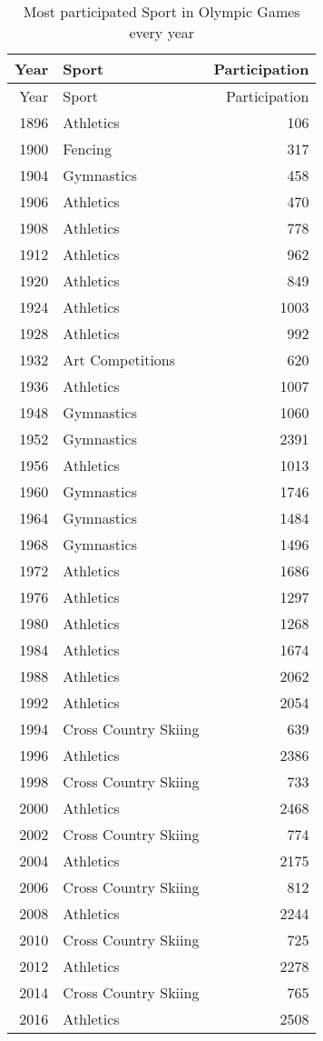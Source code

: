 \documentclass[
]{article}
\begin{document}
\begin{longtable}[]{@{}rlr@{}}
\caption{Most participated Sport in Olympic Games every
year}\tabularnewline
\toprule
Year & Sport & Participation \\
\midrule
\endfirsthead
\toprule
Year & Sport & Participation \\
\midrule
\endhead
1896 & Athletics & 106 \\
1900 & Fencing & 317 \\
1904 & Gymnastics & 458 \\
1906 & Athletics & 470 \\
1908 & Athletics & 778 \\
1912 & Athletics & 962 \\
1920 & Athletics & 849 \\
1924 & Athletics & 1003 \\
1928 & Athletics & 992 \\
1932 & Art Competitions & 620 \\
1936 & Athletics & 1007 \\
1948 & Gymnastics & 1060 \\
1952 & Gymnastics & 2391 \\
1956 & Athletics & 1013 \\
1960 & Gymnastics & 1746 \\
1964 & Gymnastics & 1484 \\
1968 & Gymnastics & 1496 \\
1972 & Athletics & 1686 \\
1976 & Athletics & 1297 \\
1980 & Athletics & 1268 \\
1984 & Athletics & 1674 \\
1988 & Athletics & 2062 \\
1992 & Athletics & 2054 \\
1994 & Cross Country Skiing & 639 \\
1996 & Athletics & 2386 \\
1998 & Cross Country Skiing & 733 \\
2000 & Athletics & 2468 \\
2002 & Cross Country Skiing & 774 \\
2004 & Athletics & 2175 \\
2006 & Cross Country Skiing & 812 \\
2008 & Athletics & 2244 \\
2010 & Cross Country Skiing & 725 \\
2012 & Athletics & 2278 \\
2014 & Cross Country Skiing & 765 \\
2016 & Athletics & 2508 \\
\bottomrule
\end{longtable}
\end{document}
